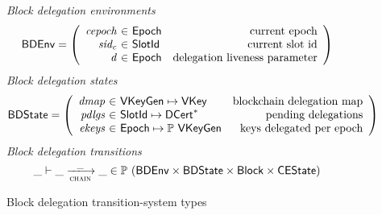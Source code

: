 \begin{figure}
  \emph{Block delegation environments}
  \begin{equation*}
    \BDEnv =
    \left(
      \begin{array}{r@{~\in~}lr}
        \var{cepoch} & \Epoch & \text{current epoch}\\
        \var{sid_c} & \SlotId & \text{current slot id}\\
        \var{d} & \Epoch & \text{delegation liveness parameter}\\
      \end{array}
    \right)
  \end{equation*}
  \emph{Block delegation states}
  \begin{equation*}
    \BDState =
    \left(
      \begin{array}{r@{~\in~}lr}
        \var{dmap} & \VKeyGen \mapsto \VKey & \text{blockchain delegation map}\\
        \var{pdlgs} & \SlotId \mapsto \seqof{\DCert} & \text{pending delegations}\\
        \var{ekeys} & \Epoch \mapsto \powerset{\VKeyGen} & \text{keys delegated per epoch}
      \end{array}
    \right)
  \end{equation*}
  \emph{Block delegation transitions}
  \begin{equation*}
    \_ \vdash \_ \trans{chain}{\_} \_ \in
      \powerset (\BDEnv \times \BDState \times \Block \times \CEState)
  \end{equation*}
  \caption{Block delegation transition-system types}
  \label{fig:ts-types:block-delegation}
\end{figure}

